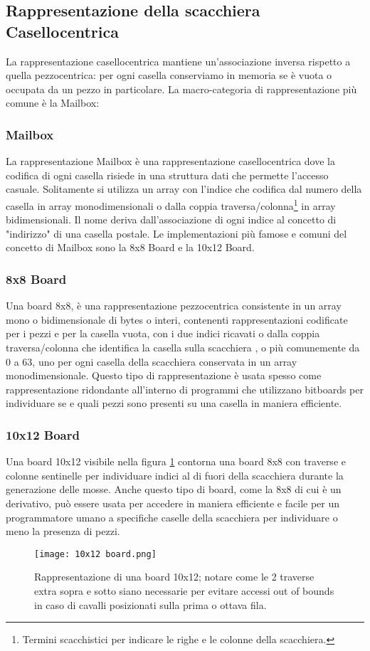 \subsection{Rappresentazione della scacchiera Casellocentrica}
La rappresentazione casellocentrica  mantiene un'associazione inversa rispetto a quella pezzocentrica:
per ogni casella conserviamo in memoria se è vuota o occupata da un pezzo in particolare.
La macro-categoria di  rappresentazione più comune è la Mailbox:

\subsubsection{Mailbox}
La rappresentazione Mailbox è una rappresentazione casellocentrica dove la codifica di ogni casella risiede in una struttura dati
che permette l'accesso casuale. Solitamente si utilizza un array con l'indice che codifica dal numero della casella in array monodimensionali
o dalla coppia traversa/colonna\footnote{Termini scacchistici per indicare le righe e le colonne della scacchiera.} in array bidimensionali.
Il nome deriva dall'associazione di ogni indice al concetto di "indirizzo" di una casella postale. Le implementazioni più famose e
comuni del concetto di Mailbox sono la 8x8 Board e la 10x12 Board.

\subsubsection{8x8 Board}
Una board 8x8, è una rappresentazione pezzocentrica consistente in un array mono o bidimensionale di bytes o interi, contenenti rappresentazioni codificate
per i pezzi e per la casella vuota, con i due indici ricavati o dalla coppia traversa/colonna che identifica la casella sulla scacchiera ,
o più comunemente da 0 a 63, uno per ogni casella della scacchiera conservata in un array monodimensionale.
Questo tipo di rappresentazione è usata spesso come rappresentazione ridondante all'interno di programmi che utilizzano bitboards
per individuare se e quali pezzi sono presenti su una casella in maniera efficiente.

\subsubsection{10x12 Board}
Una board 10x12 visibile nella figura \ref{10x12} contorna una board 8x8 con traverse e colonne sentinelle per individuare indici al di fuori della scacchiera durante la generazione delle mosse. Anche questo tipo di board, 
come la 8x8 di cui è un derivativo, può essere usata per accedere in maniera efficiente e facile per un programmatore umano a specifiche caselle della scacchiera per individuare o meno la presenza di pezzi.
\vfill
\begin{figure}[!ht]
    \centering
    \texttt{[image: 10x12 board.png]}
    \caption{Rappresentazione di una board 10x12; notare come le 2 traverse extra sopra e sotto siano necessarie per evitare accessi out of bounds in caso di cavalli posizionati sulla prima o ottava fila. }
    \label{10x12}
\end{figure}



